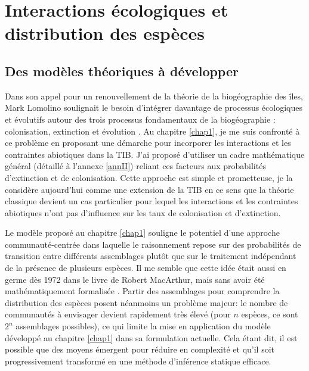 \section*{Interactions écologiques et distribution des
espèces}\label{interactions-uxe9cologiques-et-distribution-des-espuxe8ces}

\subsection*{Des modèles théoriques à
développer}\label{des-moduxe8les-thuxe9oriques-uxe0-duxe9velopper}

Dans son appel pour un renouvellement de la théorie de la biogéographie
des îles, Mark Lomolino soulignait le besoin d'intégrer davantage de
processus écologiques et évolutifs autour des trois processus
fondamentaux de la biogéographie : colonisation, extinction et évolution
\citep{Lomolino2000}. Au chapitre \ref{chap1}, je me suis confronté à ce
problème en proposant une démarche pour incorporer les interactions et
les contraintes abiotiques dans la TIB. J'ai proposé d'utiliser un cadre
mathématique général (détaillé à l'annexe \ref{annII}) reliant ces
facteurs aux probabilités d'extinction et de colonisation. Cette
approche est simple et prometteuse, je la considère aujourd'hui comme
une extension de la TIB en ce sens que la théorie classique devient un
cas particulier pour lequel les interactions et les contraintes
abiotiques n'ont pas d'influence sur les taux de colonisation et
d'extinction.

Le modèle proposé au chapitre \ref{chap1} souligne le potentiel d'une
approche communauté-centrée dans laquelle le raisonnement repose sur des
probabilités de transition entre différents assemblages
\citep{Cazelles2015a} plutôt que sur le traitement indépendant de la
présence de plusieurs espèces. Il me semble que cette idée était aussi
en germe dès 1972 dans le livre de Robert MacArthur, mais sans avoir été
mathématiquement formalisée \citep{macarthur1972geographical}. Partir
des assemblages pour comprendre la distribution des espèces posent
néanmoins un problème majeur: le nombre de communautés à envisager
devient rapidement très élevé (pour \(n\) espèces, ce sont \(2^n\)
assemblages possibles), ce qui limite la mise en application du modèle
développé au chapitre \ref{chap1} dans sa formulation actuelle. Cela
étant dit, il est possible que des moyens émergent pour réduire en
complexité et qu'il soit progressivement transformé en une méthode
d'inférence statique efficace.

